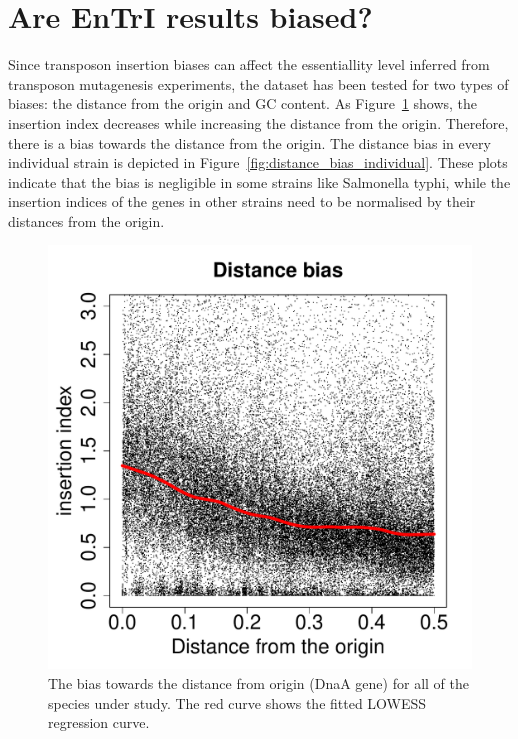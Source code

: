\documentclass[a4paper,10pt, twocolumn]{article}
\begin{document}
\section{Are EnTrI results biased?}
Since transposon insertion biases can affect the essentiallity level inferred from transposon mutagenesis experiments, the dataset has been tested for two types of biases: the distance from the origin and GC content. As Figure~\ref{fig:distance_bias} shows, the insertion index decreases while increasing the distance from the origin. Therefore, there is a bias towards the distance from the origin. The distance bias in every individual strain is depicted in Figure~\ref{fig:distance_bias_individual}. These plots indicate that the bias is negligible in some strains like Salmonella typhi, while the insertion indices of the genes in other strains need to be normalised by their distances from the origin.

\begin{figure}[H]
\includegraphics[scale=0.28, page=1]{biases.pdf}
\caption{The bias towards the distance from origin (DnaA gene) for all of the species under study. The red curve shows the fitted LOWESS regression curve.}
\label{fig:distance_bias}
\end{figure}
\end{document}
